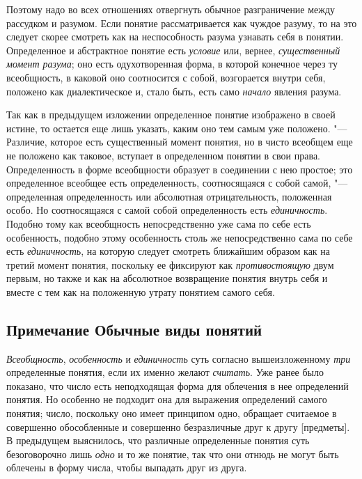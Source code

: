 {Поэтому надо во всех отношениях отвергнуть обычное
разграничение между рассудком и разумом. Если понятие рассматривается как
чуждое разуму, то на это следует скорее смотреть как на неспособность
разума узнавать себя в понятии. Определенное и абстрактное понятие есть
{\em условие} или,
вернее, {\em существенный момент
разума}; оно есть одухотворенная форма, в которой конечное
через ту всеобщность, в каковой оно соотносится с собой, возгорается внутри
себя, положено как диалектическое и, стало быть, есть само
{\em начало} явления
разума.

Так как в предыдущем изложении определенное понятие изображено
в своей истине, то остается еще лишь указать, каким оно тем самым уже
положено. "--- Различие, которое есть существенный момент
понятия, но в чисто всеобщем еще не положено как таковое, вступает в
определенном понятии в свои права. Определенность в форме всеобщности
образует в соединении с нею простое; это определенное
всеобщее есть определенность, соотносящаяся с собой самой, "---
определенная определенность или абсолютная отрицательность,
положенная особо. Но соотносящаяся с самой собой определенность есть
{\em единичность}.
Подобно тому как всеобщность непосредственно уже сама по себе
есть особенность, подобно этому особенность столь же непосредственно сама
по себе есть {\em единичность},
на которую следует смотреть ближайшим образом как на третий
момент понятия, поскольку ее фиксируют как
{\em противостоящую} двум
первым, но также и как на абсолютное возвращение понятия внутрь себя и
вместе с тем как на положенную утрату понятием самого себя.

\subsection[Примечание Обычные виды понятий]
{Примечание \newline Обычные виды понятий}

{\em Всеобщность},
{\em особенность} и
{\em единичность} суть
согласно вышеизложенному {\em три}
определенные понятия, если их именно желают
{\em считать}. Уже ранее
было показано, что число есть неподходящая форма для облечения в нее
определений
понятия.
Но особенно не подходит она для выражения определений самого
понятия; число, поскольку оно имеет принципом одно, обращает считаемое в
совершенно обособленные и совершенно безразличные друг к другу [предметы].
В предыдущем выяснилось, что различные определенные понятия суть
безоговорочно лишь {\em одно}
и то же понятие, так что они отнюдь не могут быть облечены в
форму числа, чтобы выпадать друг из друга.

}
